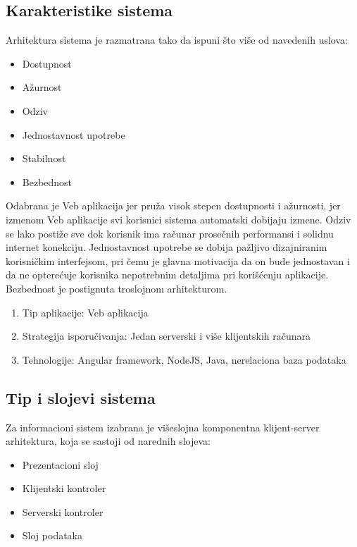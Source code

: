 \documentclass[a4paper]{article}
\begin{document}
\subsection{Karakteristike sistema}
Arhitektura sistema je razmatrana tako da ispuni što više od navedenih uslova:
\begin{itemize}
    \item Dostupnost
    \item Ažurnost
    \item Odziv
    \item Jednostavnost upotrebe
    \item Stabilnost
    \item Bezbednost
\end{itemize}
Odabrana je Veb aplikacija jer pruža visok stepen dostupnosti i ažurnosti, jer izmenom Veb aplikacije svi korisnici sistema automatski dobijaju izmene. Odziv se lako postiže sve dok korisnik ima računar prosečnih performansi i solidnu internet konekciju. Jednostavnost upotrebe se dobija pažljivo dizajniranim korisničkim interfejsom, pri čemu je glavna motivacija da on bude jednostavan i da ne opterećuje korisnika nepotrebnim detaljima pri korišćenju aplikacije. Bezbednost je postignuta troslojnom arhitekturom.

\begin{enumerate}
    \item Tip aplikacije: Veb aplikacija
    \item Strategija isporučivanja: Jedan serverski i više klijentskih računara
    \item Tehnologije: Angular framework, NodeJS, Java, nerelaciona baza podataka
\end{enumerate}

\subsection{Tip i slojevi sistema}

Za informacioni sistem izabrana je višeslojna komponentna klijent-server arhitektura, koja se sastoji od narednih slojeva:

\begin{itemize}
    \item Prezentacioni sloj
    \item Klijentski kontroler
    \item Serverski kontroler
    \item Sloj podataka
\end{itemize}
\end{document}
